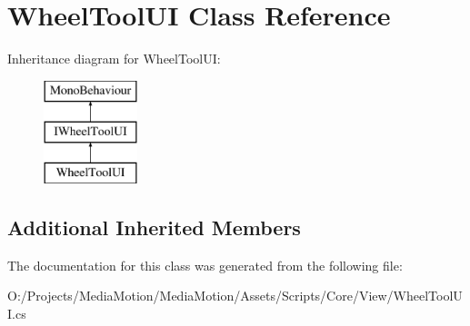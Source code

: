 \hypertarget{class_wheel_tool_u_i}{\section{Wheel\+Tool\+U\+I Class Reference}
\label{class_wheel_tool_u_i}
}
Inheritance diagram for Wheel\+Tool\+U\+I\+:\begin{figure}[H]
\begin{center}
\leavevmode
\includegraphics[height=3.000000cm]{class_wheel_tool_u_i}
\end{center}
\end{figure}
\subsection*{Additional Inherited Members}


The documentation for this class was generated from the following file\+:\begin{DoxyCompactItemize}
\item 
O\+:/\+Projects/\+Media\+Motion/\+Media\+Motion/\+Assets/\+Scripts/\+Core/\+View/Wheel\+Tool\+U\+I.\+cs\end{DoxyCompactItemize}
